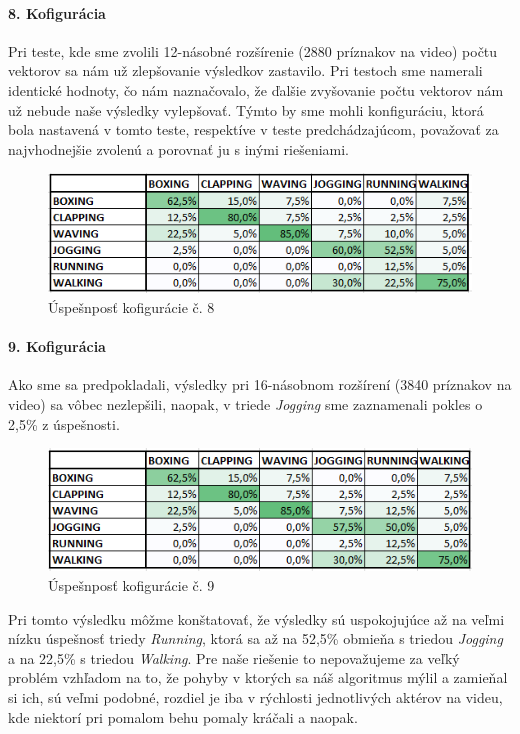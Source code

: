 \paragraph{8. Kofigurácia}
Pri teste, kde sme zvolili 12-násobné rozšírenie (2880 príznakov na video) počtu vektorov sa nám už zlepšovanie výsledkov zastavilo. Pri testoch sme namerali identické hodnoty, čo nám naznačovalo, že ďalšie zvyšovanie počtu vektorov nám už nebude naše výsledky vylepšovať. Týmto by sme mohli konfiguráciu, ktorá bola nastavená v tomto teste, respektíve v teste predchádzajúcom, považovať za najvhodnejšie zvolenú a porovnať ju s inými riešeniami.
\begin{figure}[H]
  \centering
  \includegraphics[width=14cm]{img/test6PCA12g.png}
  \caption{Úspešnposť kofigurácie č. 8}
  \label{test8}
\end{figure}  

\paragraph{9. Kofigurácia} 
Ako sme sa predpokladali, výsledky pri 16-násobnom rozšírení (3840 príznakov na video) sa vôbec nezlepšili, naopak, v triede \textit{Jogging} sme zaznamenali pokles o 2,5\% z úspešnosti. 
\begin{figure}[H]
  \centering
  \includegraphics[width=14cm]{img/test6PCA16g.png}
  \caption{Úspešnposť kofigurácie č. 9}
  \label{test9}
\end{figure} 

Pri tomto výsledku môžme konštatovať, že výsledky sú uspokojujúce až na veľmi nízku úspešnosť triedy \textit{Running}, ktorá sa až na 52,5\% obmieňa s triedou \textit{Jogging} a na 22,5\% s triedou \textit{Walking}. Pre naše riešenie to nepovažujeme za veľký problém vzhľadom na to, že pohyby v ktorých sa náš algoritmus mýlil a zamieňal si ich, sú veľmi podobné, rozdiel je iba v rýchlosti jednotlivých aktérov na videu, kde niektorí pri pomalom behu pomaly kráčali a naopak. 




